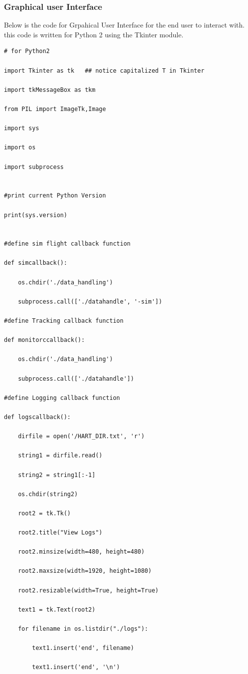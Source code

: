 \documentclass[onecolumn, draftclsnofoot,10pt, compsoc]{IEEEtran}
\begin{document}
\subsubsection {Graphical user Interface}
Below is the code for Grpahical User Interface for the end user to interact with. this code is written for Python 2 using the Tkinter module. 
\begin{lstlisting}
# for Python2

import Tkinter as tk   ## notice capitalized T in Tkinter 

import tkMessageBox as tkm

from PIL import ImageTk,Image

import sys

import os

import subprocess


#print current Python Version

print(sys.version)


#define sim flight callback function

def simcallback():

	os.chdir('./data_handling')

	subprocess.call(['./datahandle', '-sim'])

#define Tracking callback function

def monitorccallback():

	os.chdir('./data_handling')

	subprocess.call(['./datahandle'])

#define Logging callback function

def logscallback():

	dirfile = open('/HART_DIR.txt', 'r')

	string1 = dirfile.read()

	string2 = string1[:-1]

	os.chdir(string2)

	root2 = tk.Tk()

	root2.title("View Logs")

	root2.minsize(width=480, height=480)

	root2.maxsize(width=1920, height=1080)

	root2.resizable(width=True, height=True)

	text1 = tk.Text(root2)

	for filename in os.listdir("./logs"):

		text1.insert('end', filename)

		text1.insert('end', '\n')


\end{lstlisting}
\end{document}
